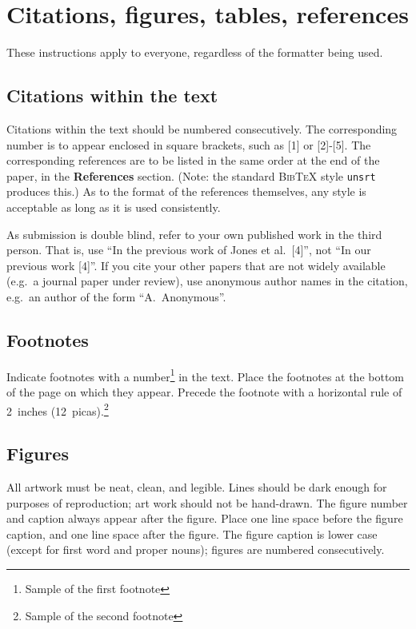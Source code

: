 \documentclass{article} %
\begin{document}
\section{Citations, figures, tables, references}
\label{others}

These instructions apply to everyone, regardless of the formatter being used.

\subsection{Citations within the text}

Citations within the text should be numbered consecutively. The corresponding
number is to appear enclosed in square brackets, such as [1] or [2]-[5]. The
corresponding references are to be listed in the same order at the end of the
paper, in the \textbf{References} section. (Note: the standard
\textsc{Bib\TeX} style \texttt{unsrt} produces this.) As to the format of the
references themselves, any style is acceptable as long as it is used
consistently.

As submission is double blind, refer to your own published work in the 
third person. That is, use ``In the previous work of Jones et al.\ [4]'',
not ``In our previous work [4]''. If you cite your other papers that
are not widely available (e.g.\ a journal paper under review), use
anonymous author names in the citation, e.g.\ an author of the
form ``A.\ Anonymous''. 


\subsection{Footnotes}

Indicate footnotes with a number\footnote{Sample of the first footnote} in the
text. Place the footnotes at the bottom of the page on which they appear.
Precede the footnote with a horizontal rule of 2~inches
(12~picas).\footnote{Sample of the second footnote}

\subsection{Figures}

All artwork must be neat, clean, and legible. Lines should be dark
enough for purposes of reproduction; art work should not be
hand-drawn. The figure number and caption always appear after the
figure. Place one line space before the figure caption, and one line
space after the figure. The figure caption is lower case (except for
first word and proper nouns); figures are numbered consecutively.
\end{document}
